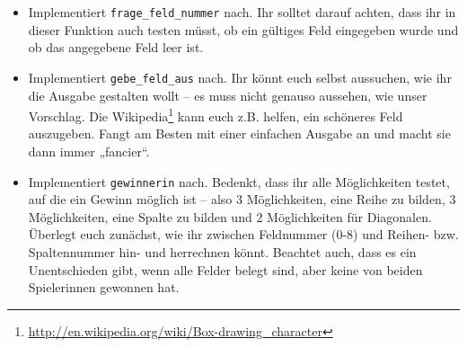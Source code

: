 \begin{praxis}
    \begin{itemize}
        \item Implementiert \texttt{frage\_feld\_nummer} nach. Ihr solltet darauf
              achten, dass ihr in dieser Funktion auch testen müsst, ob ein gültiges
              Feld eingegeben wurde und ob das angegebene Feld leer ist.
        \item Implementiert \texttt{gebe\_feld\_aus} nach. Ihr könnt euch selbst
              aussuchen, wie ihr die Ausgabe gestalten wollt -- es muss nicht genauso
              aussehen, wie unser Vorschlag. Die
              Wikipedia\footnote{\url{http://en.wikipedia.org/wiki/Box-drawing_character}}
              kann euch z.B. helfen, ein schöneres Feld auszugeben. Fangt am Besten
              mit einer einfachen Ausgabe an und macht sie dann immer „fancier“.
        \item Implementiert \texttt{gewinnerin} nach. Bedenkt, dass ihr alle
              Möglichkeiten testet, auf die ein Gewinn möglich ist -- also 3
              Möglichkeiten, eine Reihe zu bilden, 3 Möglichkeiten, eine Spalte zu
              bilden und 2 Möglichkeiten für Diagonalen. Überlegt euch zunächst, wie
              ihr zwischen Feldnummer (0-8) und Reihen- bzw. Spaltennummer hin- und
              herrechnen könnt. Beachtet auch, dass es ein Unentschieden gibt, wenn
              alle Felder belegt sind, aber keine von beiden Spielerinnen gewonnen
              hat.
    \end{itemize}
\end{praxis}
